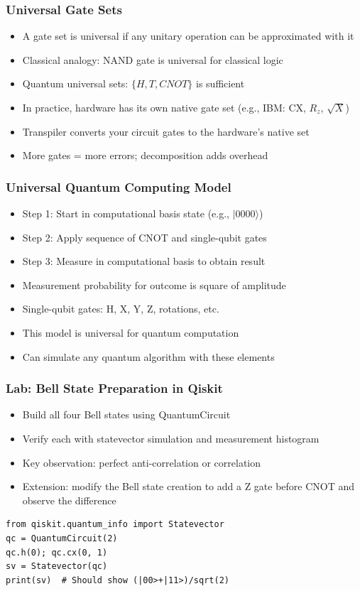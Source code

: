 \begin{frame}[fragile]\frametitle{Universal Gate Sets}
\begin{itemize}
\item A gate set is universal if any unitary operation can be approximated with it
\item Classical analogy: NAND gate is universal for classical logic
\item Quantum universal sets: $\{H, T, CNOT\}$ is sufficient
\item In practice, hardware has its own native gate set (e.g., IBM: CX, $R_z$, $\sqrt{X}$)
\item Transpiler converts your circuit gates to the hardware's native set
\item More gates = more errors; decomposition adds overhead
\end{itemize}
\end{frame}

\begin{frame}[fragile]\frametitle{Universal Quantum Computing Model}
\begin{itemize}
\item Step 1: Start in computational basis state (e.g., $|0000\rangle$)
\item Step 2: Apply sequence of CNOT and single-qubit gates
\item Step 3: Measure in computational basis to obtain result
\item Measurement probability for outcome is square of amplitude
\item Single-qubit gates: H, X, Y, Z, rotations, etc.
\item This model is universal for quantum computation
\item Can simulate any quantum algorithm with these elements
\end{itemize}
\end{frame}

\begin{frame}[fragile]\frametitle{Lab: Bell State Preparation in Qiskit}
\begin{itemize}
\item Build all four Bell states using QuantumCircuit
\item Verify each with statevector simulation and measurement histogram
\item Key observation: perfect anti-correlation or correlation
\item Extension: modify the Bell state creation to add a Z gate before CNOT and observe the difference
\end{itemize}
\begin{verbatim}
from qiskit.quantum_info import Statevector
qc = QuantumCircuit(2)
qc.h(0); qc.cx(0, 1)
sv = Statevector(qc)
print(sv)  # Should show (|00>+|11>)/sqrt(2)
\end{verbatim}
\end{frame}

